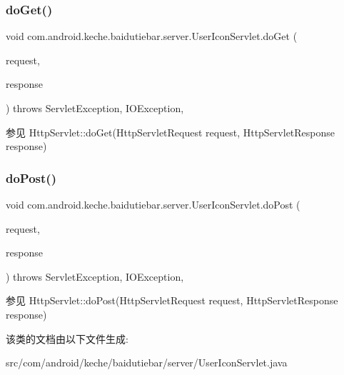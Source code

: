 \subsubsection{\texorpdfstring{do\+Get()}{doGet()}}
{\footnotesize\ttfamily void com.\+android.\+keche.\+baidutiebar.\+server.\+User\+Icon\+Servlet.\+do\+Get (\begin{DoxyParamCaption}\item[{Http\+Servlet\+Request}]{request,  }\item[{Http\+Servlet\+Response}]{response }\end{DoxyParamCaption}) throws Servlet\+Exception, I\+O\+Exception\hspace{0.3cm}{\ttfamily [inline]}, {\ttfamily [protected]}}

\begin{DoxySeeAlso}{参见}
Http\+Servlet\+::do\+Get(\+Http\+Servlet\+Request request, Http\+Servlet\+Response response) 
\end{DoxySeeAlso}
\mbox{\label{classcom_1_1android_1_1keche_1_1baidutiebar_1_1server_1_1_user_icon_servlet_abceadf7e5eb5fde6a29a142e59f21616}} 
\subsubsection{\texorpdfstring{do\+Post()}{doPost()}}
{\footnotesize\ttfamily void com.\+android.\+keche.\+baidutiebar.\+server.\+User\+Icon\+Servlet.\+do\+Post (\begin{DoxyParamCaption}\item[{Http\+Servlet\+Request}]{request,  }\item[{Http\+Servlet\+Response}]{response }\end{DoxyParamCaption}) throws Servlet\+Exception, I\+O\+Exception\hspace{0.3cm}{\ttfamily [inline]}, {\ttfamily [protected]}}

\begin{DoxySeeAlso}{参见}
Http\+Servlet\+::do\+Post(\+Http\+Servlet\+Request request, Http\+Servlet\+Response response) 
\end{DoxySeeAlso}


该类的文档由以下文件生成\+:\begin{DoxyCompactItemize}
\item 
src/com/android/keche/baidutiebar/server/User\+Icon\+Servlet.\+java\end{DoxyCompactItemize}
